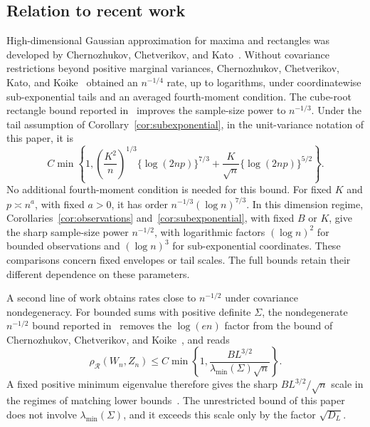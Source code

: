 \documentclass[11pt,letterpaper]{article}
\theoremstyle{remark}
\newcommand{\rh}{\rho_{\mathcal R}}
\begin{document}
\subsection{Relation to recent work}\label{sec:literature}
High-dimensional Gaussian approximation for maxima and rectangles was
developed by Chernozhukov, Chetverikov, and Kato~\cite{CCK2013,CCK2017}.
Without covariance restrictions beyond positive marginal variances,
Chernozhukov, Chetverikov, Kato, and Koike~\cite[Theorem~2.1]{CCKK2022}
obtained an \(n^{-1/4}\) rate, up to logarithms, under coordinatewise
sub-exponential tails and an averaged fourth-moment condition.
The cube-root rectangle bound reported in~\cite[Theorem~1 and Section~5]{GaoZhang} improves the sample-size power to \(n^{-1/3}\). Under the tail assumption of Corollary~\ref{cor:subexponential}, in the unit-variance notation of this paper, it is
\begin{equation*}
 C\min\left\{1,
 \left(\frac{K^2}{n}\right)^{1/3}\{\log(2np)\}^{7/3}
 +\frac K{\sqrt n}\{\log(2np)\}^{5/2}\right\}.
\end{equation*}
No additional fourth-moment condition is needed for this bound.
For fixed \(K\) and \(p\asymp n^a\), with fixed \(a>0\), it has
order \(n^{-1/3}(\log n)^{7/3}\). In this dimension regime,
Corollaries~\ref{cor:observations} and~\ref{cor:subexponential}, with
fixed \(B\) or \(K\), give the sharp sample-size power
\(n^{-1/2}\), with logarithmic factors \((\log n)^2\) for bounded
observations and \((\log n)^3\) for sub-exponential coordinates.
These comparisons concern fixed envelopes or tail scales. The full
bounds retain their different dependence on these parameters.

A second line of work obtains rates close to \(n^{-1/2}\) under
covariance nondegeneracy. For bounded sums with positive definite
\(\Sigma\), the nondegenerate \(n^{-1/2}\) bound reported in~\cite[Theorem~1.1]{AL} removes the
\(\log(en)\) factor from the bound of Chernozhukov, Chetverikov,
and Koike~\cite[Corollary~2.1]{CCK}, and reads
\begin{equation*}
 \rh(W_n,Z_n)\le C\min\left\{1,
 \frac{BL^{3/2}}{\lambda_{\min}(\Sigma)\sqrt n}\right\}.
\end{equation*}
A fixed positive minimum eigenvalue therefore gives the sharp
\(BL^{3/2}/\sqrt n\) scale in the regimes of matching lower
bounds~\cite[Proposition~2.1]{CCK}.
The unrestricted bound of this paper does not involve \(\lambda_{\min}(\Sigma)\),
and it exceeds this scale only by the factor \(\sqrt{D_L}\).
\end{document}
